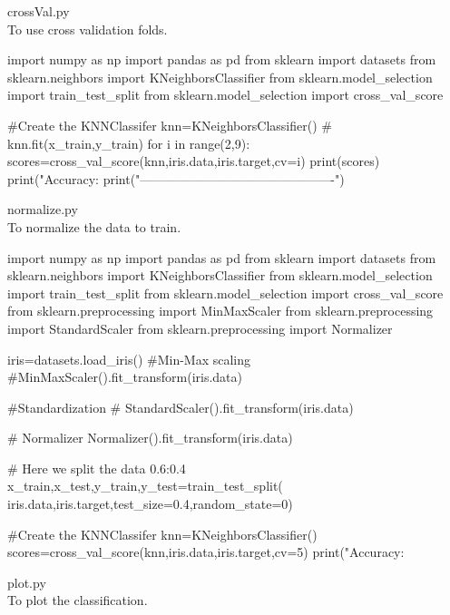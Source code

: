 \documentclass[a4pper,11pt,onecolumn]{article}
\begin{document}
crossVal.py\\

To use cross validation folds.

\begin{python}
	import numpy as np
	import pandas as pd
	from sklearn import datasets
	from sklearn.neighbors import KNeighborsClassifier
	from sklearn.model_selection import train_test_split
	from sklearn.model_selection import cross_val_score
	
	#Create the KNNClassifer
	knn=KNeighborsClassifier()
	# knn.fit(x_train,y_train)
	for i in range(2,9):
	scores=cross_val_score(knn,iris.data,iris.target,cv=i)
	print(scores)
	print("Accuracy:%
	print("----------------------------------------------")
\end{python}


normalize.py\\

To normalize the data to train.

\begin{python}
	import numpy as np
	import pandas as pd
	from sklearn import datasets
	from sklearn.neighbors import KNeighborsClassifier
	from sklearn.model_selection import train_test_split
	from sklearn.model_selection import cross_val_score
	from sklearn.preprocessing import MinMaxScaler
	from sklearn.preprocessing import StandardScaler
	from sklearn.preprocessing import Normalizer
	
	iris=datasets.load_iris()
	#Min-Max scaling
	#MinMaxScaler().fit_transform(iris.data)
	
	#Standardization
	# StandardScaler().fit_transform(iris.data)
	
	# Normalizer
	Normalizer().fit_transform(iris.data)
	
	# Here we split the data 0.6:0.4
	x_train,x_test,y_train,y_test=train_test_split(
	iris.data,iris.target,test_size=0.4,random_state=0)
	
	#Create the KNNClassifer
	knn=KNeighborsClassifier()
	scores=cross_val_score(knn,iris.data,iris.target,cv=5)
	print("Accuracy:%
\end{python}

plot.py\\

To plot the classification.
\end{document}
